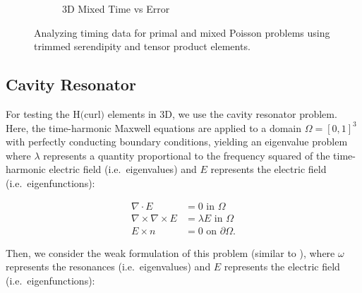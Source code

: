 \documentclass[manuscript,screen]{acmart}
\begin{document}
\begin{figure}[ht]
\begin{subfigure}[h]{0.5\textwidth}
    \caption{3D Mixed Time vs Error}
    \label{fig:3dMixedTimeError}
  \end{subfigure}
  \caption{Analyzing timing data for primal and mixed Poisson problems using trimmed serendipity and tensor product elements.}
\label{fig:PrimalMixedTimeAnalysis}
\end{figure}


\newpage  
  
\newpage 



\subsection{Cavity Resonator}

For testing the H$($curl$)$ elements in 3D, we use the cavity resonator problem.  Here, the time-harmonic Maxwell equations are applied to a domain $\Omega = [0,1]^3$ with perfectly conducting boundary conditions, yielding an eigenvalue problem where $\lambda$ represents a quantity proportional to the frequency squared of the time-harmonic electric field (i.e.\ eigenvalues) and $E$ represents the electric field (i.e.\ eigenfunctions):

\begin{align}
    \nabla \cdot E &= 0 \text{ in } \Omega \\
    \nabla \times \nabla \times E &= \lambda E  \text{ in } \Omega \\
    E \times n &= 0 \text{ on } \partial \Omega.
\end{align}

Then, we consider the weak formulation of this problem (similar to \cite{fumio1987mixed}), where $\omega$ represents the resonances (i.e.\ eigenvalues) and $E$ represents the electric field (i.e.\ eigenfunctions):
\end{document}
